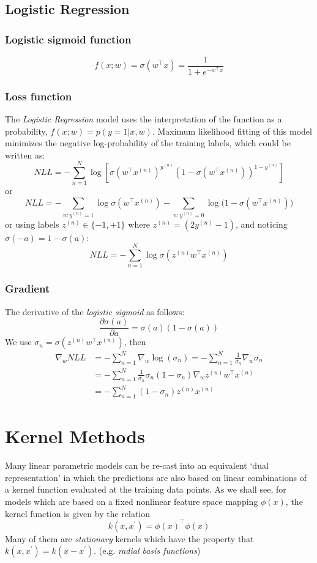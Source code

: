 \documentclass[a3paper, 12pt]{book} %
\begin{document}
\section{Logistic Regression}
\subsection{Logistic sigmoid function}
$$f(x;w)=\sigma{(w^\top x)}=\frac{1}{1+e^{-w^\top x}}$$ 
\subsection{Loss function}
The \emph{Logistic Regression} model uses the interpretation of the function as a probability, $f(x;w)=p{(y=1|x,w)}$. Maximum likelihood fitting of this model minimizes the negative log-probability of the training labels, which could be written as:
$$NLL=-\sum_{n=1}^N{\log[\sigma{(w^\top x^{(n)})^{y^{(n)}}}(1-\sigma{(w^\top x^{(n)})})^{1-y^{(n)}}]}$$
or 
$$NLL=-\sum_{n:y^{(n)}=1}{\log{\sigma{(w^\top x^{(n)})}}}-\sum_{n:y^{(n)}=0}{\log{(1-\sigma{(w^\top x^{(n)})}})}$$ 
or using labels $z^{(n)} \in \{-1, +1\}$ where $z^{(n)}=(2y^{(n)}-1)$, and noticing $\sigma{(-a)}=1-\sigma{(a)}$:
$$NLL=-\sum_{n=1}^{N}{\log{\sigma{(z^{(n)}w^\top x^{(n)})}}}$$

\subsection{Gradient}
The derivative of the \emph{logistic sigmoid} as follows:
$$\frac{\partial{\sigma{(a)}}}{\partial{a}}=\sigma{(a)}(1-\sigma{(a)})$$
We use $\sigma_{n}=\sigma{(z^{(n)}w^\top x^{(n)})}$, then
\begin{equation}
\begin{split}\nabla_w{NLL} & =-\sum_{n=1}^{N}{\nabla_w{\log{(\sigma_{n})}}}=-\sum_{n=1}^{N}{\frac{1}{\sigma_{n}}\nabla_w{\sigma_{n}}}\\
&=-\sum_{n=1}^{N}{\frac{1}{\sigma_{n}}\sigma_{n}(1-\sigma_{n})\nabla_w{z^{(n)}w^{\top}x^{(n)}}}\\
&=-\sum_{n=1}^{N}{(1-\sigma_n)z^{(n)}x^{(n)}}\end{split}
\end{equation} 



\chapter{Kernel Methods}
Many linear parametric models can be re-cast into an equivalent ‘dual representation’ in which the predictions are also based on linear combinations of a kernel
function evaluated at the training data points. As we shall see, for models which are
based on a fixed nonlinear feature space mapping $\phi{(x)}$, the kernel function is given
by the relation
$$k(x,x^{\prime})=\phi{(x)}^{\top}\phi{(x)}$$
Many of them are \emph{stationary} kernels which have the property that $k(x,x^{\prime})=k(x-x^{\prime})$. (e.g. \emph{radial basis functions})
\end{document}
